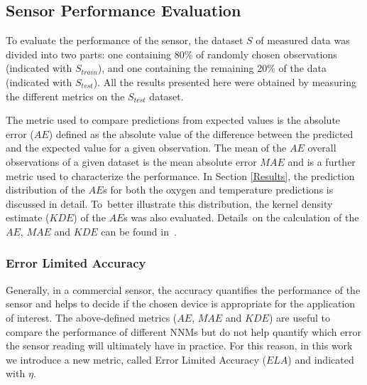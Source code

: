 \documentclass[sensors,article,accept,moreauthors,pdftex,10pt,a4paper]{Definitions/mdpi}
\begin{document}
\subsection{Sensor Performance Evaluation}

To evaluate the performance of the sensor, the dataset $S$ of measured data was divided into two parts: one containing 80\% of randomly chosen observations (indicated with $S_{train}$), and one containing the remaining 20\% of the data (indicated with $S_{test}$). All the results presented here were obtained by measuring the different metrics on the $S_{test}$ dataset.

The metric used to compare predictions from expected values is the absolute error ($AE$) defined as the absolute value of the difference between the predicted and the expected value for a given observation. 
The mean of the $AE$ overall observations of a given dataset is the mean absolute error $MAE$ and is a further metric used to characterize the performance.
In Section \ref{Results}, the prediction distribution of the $AE$s for both the oxygen and temperature predictions is  discussed in detail. To~better illustrate this distribution, the kernel density estimate ($KDE$) of the $AE$s was also evaluated. Details~on the calculation of the $AE$, $MAE$ and $KDE$ can be found in~\cite{Michelucci2019_2}.


\subsubsection{Error Limited Accuracy}
\label{sektion:ela}

Generally, in a commercial sensor, the accuracy quantifies the performance of the sensor and helps to decide if the chosen device is appropriate for the application of interest. The above-defined metrics ($AE$, $MAE$ and $KDE$) are useful to compare the performance of different NNMs but do not help quantify which error the sensor reading will ultimately have in practice.
For this reason, in this work we introduce a new metric, called Error Limited Accuracy ($ELA$) and indicated with $\eta$.
\end{document}
